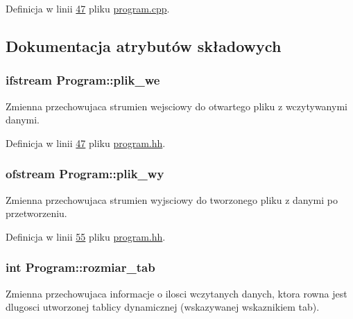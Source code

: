 Definicja w linii \hyperlink{program_8cpp_source_l00047}{47} pliku \hyperlink{program_8cpp_source}{program.\-cpp}.



\subsection{Dokumentacja atrybutów składowych}
\hypertarget{class_program_aac2f72538e24e533c327fe5546a59210}{
\subsubsection[{plik\-\_\-we}]{\setlength{\rightskip}{0pt plus 5cm}ifstream Program\-::plik\-\_\-we\hspace{0.3cm}{\ttfamily [protected]}}}\label{class_program_aac2f72538e24e533c327fe5546a59210}
Zmienna przechowujaca strumien wejsciowy do otwartego pliku z wczytywanymi danymi. 

Definicja w linii \hyperlink{program_8hh_source_l00047}{47} pliku \hyperlink{program_8hh_source}{program.\-hh}.

\hypertarget{class_program_a59c1761a5ea875b3d5a4678928f3a1de}{
\subsubsection[{plik\-\_\-wy}]{\setlength{\rightskip}{0pt plus 5cm}ofstream Program\-::plik\-\_\-wy\hspace{0.3cm}{\ttfamily [protected]}}}\label{class_program_a59c1761a5ea875b3d5a4678928f3a1de}
Zmienna przechowujaca strumien wyjsciowy do tworzonego pliku z danymi po przetworzeniu. 

Definicja w linii \hyperlink{program_8hh_source_l00055}{55} pliku \hyperlink{program_8hh_source}{program.\-hh}.

\hypertarget{class_program_a3b5a10104019b9daa23ce4a5f5533820}{
\subsubsection[{rozmiar\-\_\-tab}]{\setlength{\rightskip}{0pt plus 5cm}int Program\-::rozmiar\-\_\-tab\hspace{0.3cm}{\ttfamily [protected]}}}\label{class_program_a3b5a10104019b9daa23ce4a5f5533820}
Zmienna przechowujaca informacje o ilosci wczytanych danych, ktora rowna jest dlugosci utworzonej tablicy dynamicznej (wskazywanej wskaznikiem tab). 

